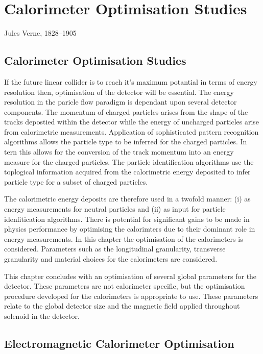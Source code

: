 \chapter{Calorimeter Optimisation Studies}
\label{chap:MoreStuff}

{Jules Verne, 1828--1905}

\section{Calorimeter Optimisation Studies}

If the future linear collider is to reach it's maximum potantial in terms of energy resolution then, optimisation of the detector will be essential.  The energy resolution in the paricle flow paradigm is dependant upon several detector components.  The momentum of charged particles arises from the shape of the tracks depostied within the detector while the energy of uncharged particles arise from calorimetric measurements.  Application of sophisticated pattern recognition algorithms allows the particle type to be inferred for the charged particles.  In tern this allows for the conversion of the track momentum into an energy measure for the charged particles.  The particle identification algorithms use the toplogical information acquired from the calorimetric energy deposited to infer particle type for a subset of charged particles.  

The calorimetric energy deposits are therefore used in a twofold manner: (i) as energy measurements for neutral particles and (ii) as input for particle idenfitication algorithms.  There is potential for significant gains to be made in physics performance by optimising the calorimters due to their dominant role in energy measurements.  In this chapter the optimisation of the calorimeters is considered.  Parameters such as the longitudinal granularity, transverse granularity and material choices for the calorimeters are considered.  

This chapter concludes with an optimisation of several global parameters for the detector.  These parameters are not calorimeter specific, but the optimisation procedure developed for the calorimeters is appropriate to use.  These parameters relate to the global detector size and the magnetic field applied throughout solenoid in the detector.

\section{Electromagnetic Calorimeter Optimisation}
\label{optstud:sec:ecal}

